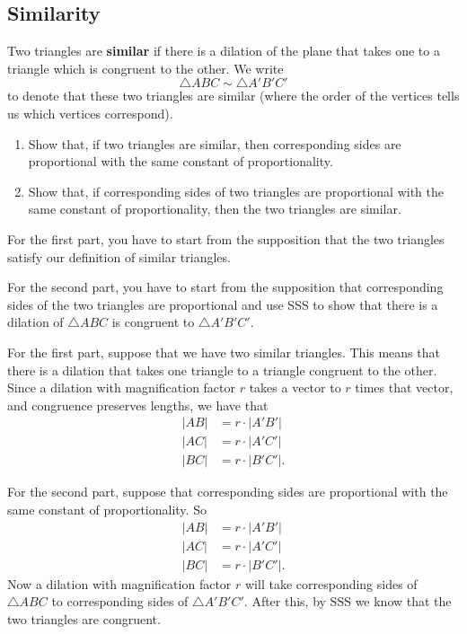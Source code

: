 \documentclass[newpage,hints,handout,12pt,noauthor,nooutcomes]{ximera}
\begin{document}
\subsection{Similarity}

\begin{definition}
Two triangles are \textbf{similar} if there is a dilation of the
plane that takes one to a triangle which is congruent to the other. We write%
\[
\triangle ABC\sim\triangle A'B'C'%
\]
to denote that these two triangles are similar (where the order of the
vertices tells us which vertices correspond).
\end{definition}

\begin{problem}\hfil
\begin{enumerate}
\item Show that, if two triangles are similar, then corresponding
sides are proportional with the same constant of proportionality.

\item Show that, if corresponding sides of two triangles are
  proportional with the same constant of proportionality, then the two
  triangles are similar.


\end{enumerate}
\begin{hint}
For the first part, you have to start from the supposition that the
two triangles satisfy our definition of similar triangles.
\end{hint}
\begin{hint}
For the second part, you have to start from the supposition that
corresponding sides of the two triangles are proportional and use SSS
to show that there is a dilation of $\triangle ABC$ is congruent to
$\triangle A'B'C'$.
\end{hint}
\begin{freeResponse}
For the first part, suppose that we have two similar triangles. This
means that there is a dilation that takes one triangle to a triangle
congruent to the other. Since a dilation with magnification factor
$r$ takes a vector to $r$ times that vector, and congruence preserves
lengths, we have that
\begin{align*}
|AB| &= r\cdot |A'B'|\\
|AC| &= r\cdot |A'C'|\\
|BC| &= r\cdot |B'C'|.
\end{align*}


For the second part, suppose that corresponding sides are proportional
with the same constant of proportionality. So
\begin{align*}
|AB| &= r\cdot |A'B'|\\
|AC| &= r\cdot |A'C'|\\
|BC| &= r\cdot |B'C'|.
\end{align*}
Now a dilation with magnification factor $r$ will take corresponding
sides of $\triangle ABC$ to corresponding sides of $\triangle
A'B'C'$. After this, by SSS we know that the two triangles are
congruent.
\end{freeResponse}
\end{problem}
\end{document}
